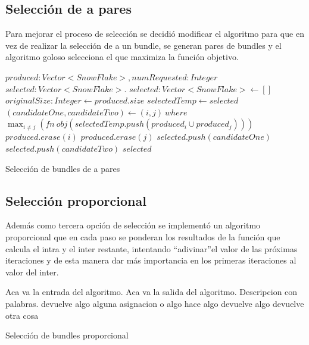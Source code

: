 \subsection{Selección de a pares}
Para mejorar el proceso de selección se decidió modificar el algoritmo para que en vez de realizar 
la selección de a un bundle, se generan pares de bundles y el algoritmo goloso selecciona el que 
maximiza la función objetivo.
\begin{algorithm}[H]
\begin{algorithmic}[1]
\REQUIRE $produced:Vector<SnowFlake>, numRequested:Integer$
\ENSURE $selected:Vector<SnowFlake>$.
\STATE $selected:Vector<SnowFlake> \leftarrow []$
\STATE $originalSize:Integer \leftarrow produced.size$
\STATE $selectedTemp \leftarrow selected$
\STATE $(candidateOne, candidateTwo) \leftarrow (i, j)\ where$ \\ 
$\displaystyle\max_{i \neq j} (fn\ obj(selectedTemp.push(produced_{i} \cup produced_{j})))$
\STATE $produced.erase(i)$
\STATE $produced.erase(j)$
\STATE $selected.push(candidateOne)$
\STATE $selected.push(candidateTwo)$
\ENDWHILE
\RETURN $selected$
\end{algorithmic}
\caption{Selección de bundles de a pares}\label{alg:algSelTuple}
\end{algorithm}
\subsection{Selección proporcional}
Además como tercera opción de selección se implementó un algoritmo proporcional que en cada paso se 
ponderan los resultados de la función que calcula el intra y el inter restante, intentando 
\textquotedblleft adivinar\textquotedblright  el valor de las próximas iteraciones y de esta manera 
dar más importancia en los primeras iteraciones al valor del inter.
\begin{algorithm}[H]
\begin{algorithmic}[1]
\REQUIRE Aca va la entrada del algoritmo.
\ENSURE Aca va la salida del algoritmo.
\STATE Descripcion con palabras.
\RETURN devuelve algo
\ELSE
\STATE alguna asignacion o algo
\ENDIF
\ENDWHILE
{}
\STATE hace algo
\RETURN devuelve algo
\ENDIF
\ENDFOR
\RETURN devuelve otra cosa
\end{algorithmic}
\caption{Selección de bundles proporcional}\label{alg:algSelProp}
\end{algorithm}

